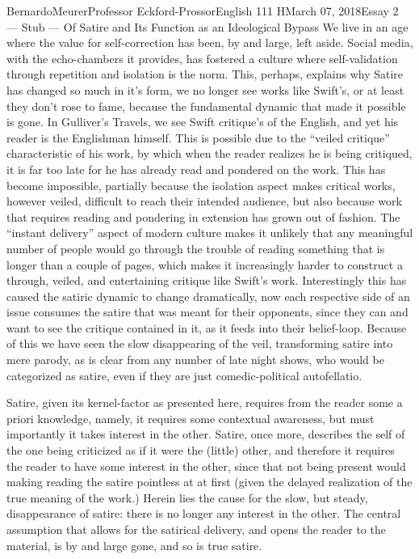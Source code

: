 \documentclass[12pt,letterpaper]{article}
\begin{document}
\begin{mla}{Bernardo}{Meurer}{Professor Eckford-Prossor}{English 111 H}{March 07, 2018}{Essay 2 --- Stub --- Of Satire and Its Function as an Ideological Bypass}
    We live in an age where the value for self-correction has been, by and large, left aside. Social media, with the echo-chambers it provides, has fostered a culture where self-validation through repetition and isolation is the norm. This, perhaps, explains why Satire has changed so much in it's form, we no longer see works like Swift's, or at least they don't rose to fame, because the fundamental dynamic that made it possible is gone. In Gulliver's Travels, we see Swift critique's of the English, and yet his reader is the Englishman himself. This is possible due to the ``veiled critique'' characteristic of his work, by which when the reader realizes he is being critiqued, it is far too late for he has already read and pondered on the work. This has become impossible, partially because the isolation aspect makes critical works, however veiled, difficult to reach their intended audience, but also because work that requires reading and pondering in extension has grown out of fashion. The ``instant delivery'' aspect of modern culture makes it unlikely that any meaningful number of people would go through the trouble of reading something that is longer than a couple of pages, which makes it increasingly harder to construct a through, veiled, and entertaining critique like Swift's work. Interestingly this has caused the satiric dynamic to change dramatically, now each respective side of an issue consumes the satire that was meant for their opponents, since they can and want to see the critique contained in it, as it feeds into their belief-loop. Because of this we have seen the slow disappearing of the veil, transforming satire into mere parody, as is clear from any number of late night shows, who would be categorized as satire, even if they are just comedic-political autofellatio.

    Satire, given its kernel-factor as presented here, requires from the reader some a priori knowledge, namely, it requires some contextual awareness, but must importantly it takes interest in the other. Satire, once more, describes the self of the one being criticized as if it were the (little) other, and therefore it requires the reader to have some interest in the other, since that not being present would making reading the satire pointless at at first (given the delayed realization of the true meaning of the work.) Herein lies the cause for the slow, but steady, disappearance of satire: there is no longer any interest in the other. The central assumption that allows for the satirical delivery, and opens the reader to the material, is by and large gone, and so is true satire.

\end{mla}
\end{document}
